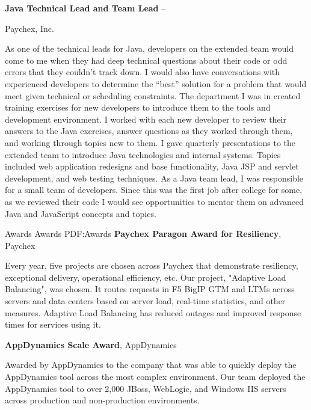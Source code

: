 \documentclass[letterpaper,MMMMyyyy,nonstopmode]{simpleresumecv}
\begin{document}
\begin{Body}
\ifC      %
\BigGap
\Entry
\textbf{Java Technical Lead and Team Lead}
\hfill
{} -- 

Paychex, Inc.
\begin{Detail}
\BulletItem
As one of the technical leads for Java, developers on the extended team would come to me when they had deep technical questions about their code or odd errors that they couldn't track down. I would also have conversations with experienced developers to determine the ``best'' solution for a problem that would meet given technical or scheduling constraints.
\BulletItem
The department I was in created training exercises for new developers to introduce them to the tools and development environment. I worked with each new developer to review their answers to the Java exercises,  answer questions as they worked through them, and working through topics new to them.
\BulletItem
I gave quarterly presentations to the extended team to introduce Java technologies and internal systems. Topics included web application redesigns and base functionality, Java JSP and servlet development, and web testing techniques.
\BulletItem
As a Java team lead, I was responsible for a small team of developers. Since this was the first job after college for some, as we reviewed their code I would see opportunities to mentor them on advanced Java and JavaScript concepts and topics.
\end{Detail}
\fi      %

\fi %


\Section
{Awards}
{Awards}
{PDF:Awards}
\textbf{Paychex Paragon Award for Resiliency}, Paychex
\hfill
{}
\begin{Detail}
Every year, five projects are chosen across Paychex that demonstrate resiliency, exceptional delivery, operational efficiency, etc.
Our project, "Adaptive Load Balancing", was chosen. It routes requests in F5 BigIP GTM and LTMs across servers and data centers based on server load, real-time statistics, and other measures. Adaptive Load Balancing has reduced outages and improved response times for services using it.
\end{Detail}
\BigGap

\textbf{AppDynamics Scale Award}, AppDynamics
\hfill
{}
\begin{Detail}
Awarded by AppDynamics to the company that was able to quickly deploy the AppDynamics tool across the most complex environment. Our team deployed the AppDynamics tool to over 2,000 JBoss, WebLogic, and Windows IIS servers across production and non-production environments.
\end{Detail}


\end{Body}
\end{document}
